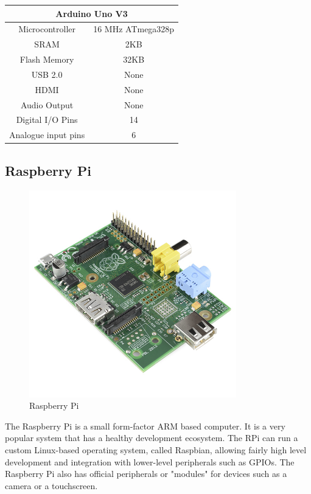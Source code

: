 \documentclass[10pt]{article}
\begin{document}
\begin{center}
	\begin{tabular}{ | c | c | }
		\hline
	 	\multicolumn{2}{|c|}{Arduino Uno V3} \\ \hline
		Microcontroller 	& 16 MHz ATmega328p \\ \hline
		SRAM 			& 2KB \\ \hline
		Flash Memory	& 32KB \\ \hline
		USB 2.0		& None \\ \hline
		HDMI 			& None \\ \hline
		Audio Output	& None \\ \hline
		Digital I/O Pins	& 14 \\ \hline
		Analogue input pins & 6 \\ \hline
	\end{tabular}
\end{center}
\newpage
\subsection{Raspberry Pi}

\begin{figure}[h]
\centering
\caption{Raspberry Pi}
\label{Raspberry Pi}
\includegraphics[height=9cm]{images/Raspberry-Pi.jpg}
\end{figure}
The Raspberry Pi is a small form-factor ARM based computer. It is a very popular system that has a healthy development ecosystem. The RPi can run a custom Linux-based operating system, called Raspbian, allowing fairly high level development and integration with lower-level peripherals such as GPIOs. The Raspberry Pi also has official peripherals or "modules" for devices such as a camera or a touchscreen.
\end{document}

